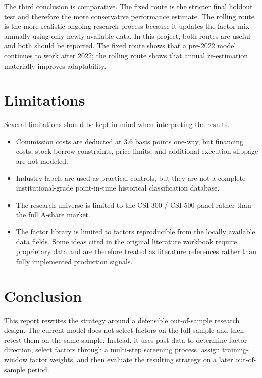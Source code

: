 \documentclass[11pt]{article}
\begin{document}
The third conclusion is comparative. The fixed route is the stricter final holdout test and therefore the more conservative performance estimate. The rolling route is the more realistic ongoing research process because it updates the factor mix annually using only newly available data. In this project, both routes are useful and both should be reported. The fixed route shows that a pre-2022 model continues to work after 2022; the rolling route shows that annual re-estimation materially improves adaptability.

\section{Limitations}

Several limitations should be kept in mind when interpreting the results.

\begin{itemize}
    \item Commission costs are deducted at 3.6 basis points one-way, but financing costs, stock-borrow constraints, price limits, and additional execution slippage are not modeled.
    \item Industry labels are used as practical controls, but they are not a complete institutional-grade point-in-time historical classification database.
    \item The research universe is limited to the CSI 300 / CSI 500 panel rather than the full A-share market.
    \item The factor library is limited to factors reproducible from the locally available data fields. Some ideas cited in the original literature workbook require proprietary data and are therefore treated as literature references rather than fully implemented production signals.
\end{itemize}

\section{Conclusion}

This report rewrites the strategy around a defensible out-of-sample research design. The current model does not select factors on the full sample and then retest them on the same sample. Instead, it uses past data to determine factor direction, select factors through a multi-step screening process, assign training-window factor weights, and then evaluate the resulting strategy on a later out-of-sample period.
\end{document}
